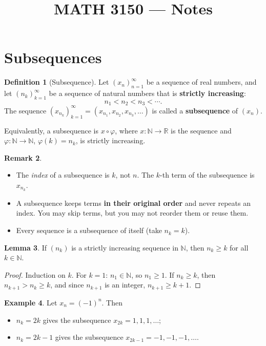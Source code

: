 \documentclass[11pt]{article}
\title{MATH 3150 --- Notes}
\author{}
\date{}
\theoremstyle{definition}
\newtheorem{defn}{Definition}[section]
\newtheorem{lem}[defn]{Lemma}
\newtheorem{ex}[defn]{Example}
\newtheorem{rem}[defn]{Remark}
\newcommand{\N}{\mathbb{N}}
\newcommand{\R}{\mathbb{R}}
\newcommand{\key}[1]{\textcolor{red!70!black}{\textbf{#1}}}
\begin{document}
\maketitle

\section{Subsequences}

\begin{defn}[Subsequence]
Let $(x_n)_{n=1}^\infty$ be a sequence of real numbers, and let
$(n_k)_{k=1}^\infty$ be a sequence of natural numbers that is
\key{strictly increasing}:
\[
  n_1 < n_2 < n_3 < \cdots .
\]
The sequence $(x_{n_k})_{k=1}^\infty = (x_{n_1}, x_{n_2}, x_{n_3}, \dots)$
is called a \textbf{subsequence} of $(x_n)$.
\end{defn}

Equivalently, a subsequence is $x \circ \varphi$, where
$x:\N\to\R$ is the sequence and $\varphi:\N\to\N$, $\varphi(k)=n_k$,
is strictly increasing.

\begin{rem}
\leavevmode
\begin{itemize}[nosep]
  \item The \emph{index} of a subsequence is $k$, not $n$. The $k$-th term
        of the subsequence is $x_{n_k}$.
  \item A subsequence keeps terms \textbf{in their original order} and
        never repeats an index. You may skip terms, but you may not reorder
        them or reuse them.
  \item Every sequence is a subsequence of itself (take $n_k=k$).
\end{itemize}
\end{rem}

\begin{lem}\label{lem:nk}
If $(n_k)$ is a strictly increasing sequence in $\N$, then $n_k \ge k$ for
all $k\in\N$.
\end{lem}

\begin{proof}
Induction on $k$. For $k=1$: $n_1\in\N$, so $n_1\ge 1$. If $n_k\ge k$, then
$n_{k+1}>n_k\ge k$, and since $n_{k+1}$ is an integer, $n_{k+1}\ge k+1$.
\end{proof}

\begin{ex}
Let $x_n = (-1)^n$. Then
\begin{itemize}[nosep]
  \item $n_k = 2k$ gives the subsequence $x_{2k} = 1,1,1,\dots$;
  \item $n_k = 2k-1$ gives the subsequence $x_{2k-1} = -1,-1,-1,\dots$.
\end{itemize}
\end{ex}
\end{document}
